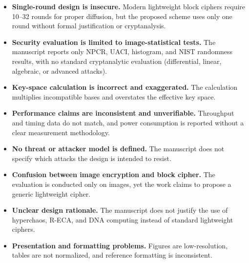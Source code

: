 \documentclass[a4paper]{article}
\begin{document}
\begin{itemize}
    \item \textbf{Single-round design is insecure.} Modern lightweight block ciphers require 10--32 rounds for proper diffusion, but the proposed scheme uses only one round without formal justification or cryptanalysis.
    \item \textbf{Security evaluation is limited to image-statistical tests.} The manuscript reports only NPCR, UACI, histogram, and NIST randomness results, with no standard cryptanalytic evaluation (differential, linear, algebraic, or advanced attacks).
    \item \textbf{Key-space calculation is incorrect and exaggerated.} The calculation multiplies incompatible bases and overstates the effective key space.
    \item \textbf{Performance claims are inconsistent and unverifiable.} Throughput and timing data do not match, and power consumption is reported without a clear measurement methodology.
    \item \textbf{No threat or attacker model is defined.} The manuscript does not specify which attacks the design is intended to resist.
    \item \textbf{Confusion between image encryption and block cipher.} The evaluation is conducted only on images, yet the work claims to propose a generic lightweight cipher.
    \item \textbf{Unclear design rationale.} The manuscript does not justify the use of hyperchaos, R-ECA, and DNA computing instead of standard lightweight ciphers.
    \item \textbf{Presentation and formatting problems.} Figures are low-resolution, tables are not normalized, and reference formatting is inconsistent.
\end{itemize}
\end{document}
